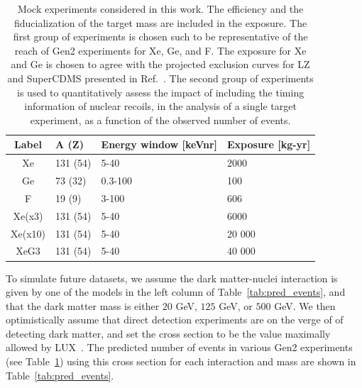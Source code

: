 \documentclass[11pt]{article}
\begin{document}
\begin{table}[tbp]
  \setlength{\extrarowheight}{3pt}
  \setlength{\tabcolsep}{10pt}
  \begin{center}
	\begin{tabular}{c|m{2.3cm}m{4.2cm}m{2.8cm}}  
	Label & A (Z) & Energy window [keVnr] & Exposure [kg-yr] \\
	\hline
	Xe & 131 (54) & 5-40 & 2000 \\
	Ge & 73 (32) & 0.3-100 & 100  \\
	F &  19 (9) & 3-100 & 606 \\

	\hline
	Xe(x3) & 131 (54) & 5-40 & 6000 \\
	Xe(x10) & 131 (54) & 5-40 & 20 000 \\
	XeG3 & 131 (54) & 5-40 & 40 000 \\
	\end{tabular}
  \end{center}
\caption{Mock experiments considered in this work. The efficiency and the fiducialization of the target mass are included in the exposure. The first group of experiments is chosen such to be representative of the reach of Gen2 experiments for Xe, Ge, and F. The exposure for Xe and Ge is chosen to agree with the projected exclusion curves for LZ and SuperCDMS presented in Ref.~\cite{Cushman:2013zza}. The second group of experiments is used to quantitatively assess the impact of including the timing information of nuclear recoils, in the analysis of a single target experiment, as a function of the observed number of events. }
\label{tab:experiments}
\end{table}



To simulate future datasets, we assume the dark matter-nuclei interaction is given by one of the models in the left column of Table~\ref{tab:pred_events}, and that the dark matter mass is either $20$ GeV, $125$ GeV, or $500$ GeV. We then optimistically assume that direct detection experiments are on the verge of of detecting dark matter, and set the cross section to be the value maximally allowed by LUX~\cite{Akerib:2016vxi}. The predicted number of events in various Gen2 experiments (see Table~\ref{tab:experiments}) using this cross section for each interaction and mass are shown in Table~\ref{tab:pred_events}. 
\end{document}
